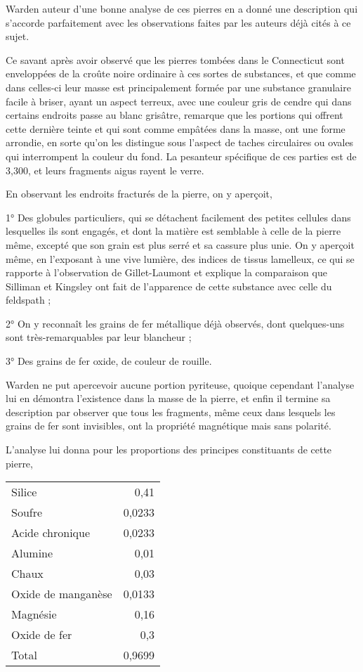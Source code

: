 \documentclass[a4paper, 12pt, oneside, french]{article}
\begin{document}
Warden auteur d'une bonne analyse de ces pierres en a donné une description qui s'accorde parfaitement avec les observations faites par les auteurs déjà cités à ce sujet.

Ce savant après avoir observé que les pierres tombées dans le Connecticut sont enveloppées de la croûte noire ordinaire à ces sortes de substances, et que comme dans celles-ci leur masse est principalement formée par une substance granulaire facile à briser, ayant un aspect terreux, avec une couleur gris de cendre qui dans certains endroits passe au blanc grisâtre, remarque que les portions qui offrent cette dernière teinte et qui sont comme empâtées dans la masse, ont une forme arrondie, en sorte qu'on les distingue sous l'aspect de taches circulaires ou ovales qui interrompent la couleur du fond. La pesanteur spécifique de ces parties est de 3,300, et leurs fragments aigus rayent le verre.

En observant les endroits fracturés de la pierre, on y aperçoit,

1° Des globules particuliers, qui se détachent facilement des petites cellules dans lesquelles ils sont engagés, et dont la matière est semblable à celle de la pierre même, excepté que son grain est plus serré et sa cassure plus unie. On y aperçoit même, en l'exposant à une vive lumière, des indices de tissus lamelleux, ce qui se rapporte à l'observation de Gillet-Laumont et explique la comparaison que Silliman et Kingsley ont fait de l'apparence de cette substance avec celle du feldspath ;

2° On y reconnaît les grains de fer métallique déjà observés, dont quelques-uns sont très-remarquables par leur blancheur ;

3° Des grains de fer oxide, de couleur de rouille.

Warden ne put apercevoir aucune portion pyriteuse, quoique cependant l'analyse lui en démontra l'existence dans la masse de la pierre, et enfin il termine sa description par observer que tous les fragments, même ceux dans lesquels les grains de fer sont invisibles, ont la propriété magnétique mais sans polarité.

L'analyse lui donna pour les proportions des principes constituants de cette pierre,
\begin{table}[H]
    \centering
    \Fontauri
    \large
    \begin{tabular}{l r}
        Silice & 0,41 \\
        Soufre & 0,0233 \\
        Acide chronique & 0,0233 \\
        Alumine & 0,01 \\
        Chaux & 0,03 \\
        Oxide de manganèse & 0,0133 \\
        Magnésie & 0,16 \\
        Oxide de fer & 0,3 \\ \hline
        Total & 0,9699 \\
    \end{tabular}
\end{table}
\end{document}
